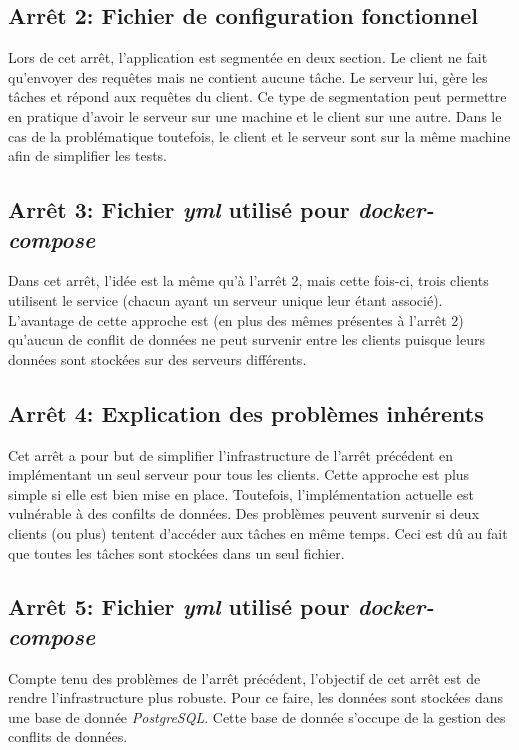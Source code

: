 \documentclass[a11paper, 11pt]{article}
\begin{document}
\subsection{Arrêt 2: Fichier de configuration fonctionnel}


\newpage

Lors de cet arrêt, l'application est segmentée en deux section. Le client ne
fait qu'envoyer des requêtes mais ne contient aucune tâche. Le serveur lui,
gère les tâches et répond aux requêtes du client. Ce type de segmentation peut
permettre en pratique d'avoir le serveur sur une machine et le client sur une
autre. Dans le cas de la problématique toutefois, le client et le serveur sont
sur la même machine afin de simplifier les tests.

\subsection{Arrêt 3: Fichier \textit{yml} utilisé pour \textit{docker-compose}}


Dans cet arrêt, l'idée est la même qu'à l'arrêt 2, mais cette fois-ci, trois
clients utilisent le service (chacun ayant un serveur unique leur étant
associé). L'avantage de cette approche est (en plus des mêmes présentes à
l'arrêt 2) qu'aucun de conflit de données ne peut survenir entre les clients
puisque leurs données sont stockées sur des serveurs différents.

\subsection{Arrêt 4: Explication des problèmes inhérents}

Cet arrêt a pour but de simplifier l'infrastructure de l'arrêt précédent en
implémentant un seul serveur pour tous les clients. Cette approche est plus
simple si elle est bien mise en place. Toutefois, l'implémentation actuelle est
vulnérable à des confilts de données. Des problèmes peuvent survenir si deux
clients (ou plus) tentent d'accéder aux tâches en même temps. Ceci est dû au
fait que toutes les tâches sont stockées dans un seul fichier.

\subsection{Arrêt 5: Fichier \textit{yml} utilisé pour \textit{docker-compose}}


Compte tenu des problèmes de l'arrêt précédent, l'objectif de cet arrêt est de
rendre l'infrastructure plus robuste. Pour ce faire, les données sont stockées
dans une base de donnée \textit{PostgreSQL}. Cette base de donnée s'occupe de
la gestion des conflits de données.
\end{document}
